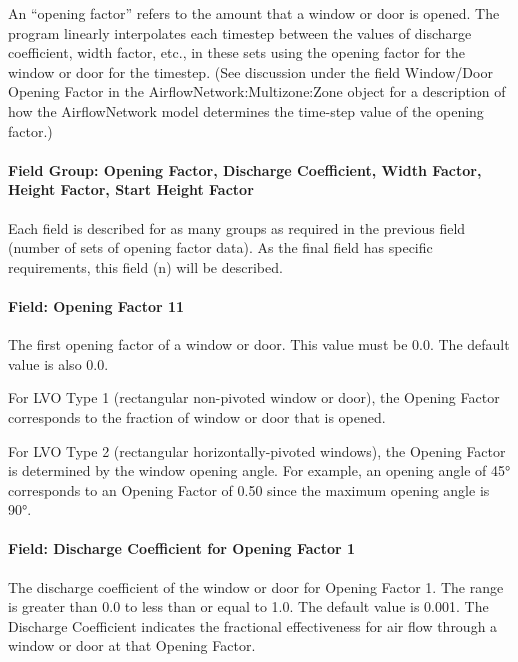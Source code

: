 An ``opening factor'' refers to the amount that a window or door is opened. The program linearly interpolates each timestep between the values of discharge coefficient, width factor, etc., in these sets using the opening factor for the window or door for the timestep. (See discussion under the field Window/Door Opening Factor in the Air\-flow\-Net\-work:\-Multi\-zone:\-Zone object for a description of how the Air\-flow\-Net\-work model determines the time-step value of the opening factor.)

\paragraph{Field Group: Opening Factor, Discharge Coefficient, Width Factor, Height Factor, Start Height Factor}\label{field-group-opening-factor-discharge-coefficient-width-factor-height-factor-start-height-factor}

Each field is described for as many groups as required in the previous field (number of sets of opening factor data). As the final field has specific requirements, this field (n) will be described.

\paragraph{Field: Opening Factor 11}\label{field-opening-factor-11}

The first opening factor of a window or door. This value must be 0.0. The default value is also 0.0.

For LVO Type 1 (rectangular non-pivoted window or door), the Opening Factor corresponds to the fraction of window or door that is opened.

For LVO Type 2 (rectangular horizontally-pivoted windows), the Opening Factor is determined by the window opening angle. For example, an opening angle of 45° corresponds to an Opening Factor of 0.50 since the maximum opening angle is 90°.

\paragraph{Field: Discharge Coefficient for Opening Factor 1}\label{field-discharge-coefficient-for-opening-factor-1}

The discharge coefficient of the window or door for Opening Factor 1. The range is greater than 0.0 to less than or equal to 1.0. The default value is 0.001. The Discharge Coefficient indicates the fractional effectiveness for air flow through a window or door at that Opening Factor.


